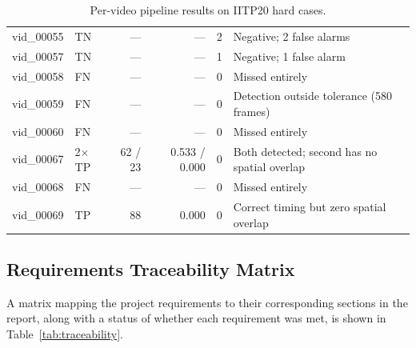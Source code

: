 \begin{table}[!htbp]
\begin{tabularx}{\textwidth}{l l r r c >{\raggedright\arraybackslash}X}
		\addlinespace
		vid\_00055     & TN               & ---                  & ---           & 2                  & Negative; 2 false alarms                             \\
		\addlinespace
		vid\_00057     & TN               & ---                  & ---           & 1                  & Negative; 1 false alarm                              \\
		\addlinespace
		vid\_00058     & FN               & ---                  & ---           & 0                  & Missed entirely                                      \\
		\addlinespace
		vid\_00059     & FN               & ---                  & ---           & 0                  & Detection outside tolerance (580 frames)             \\
		\addlinespace
		vid\_00060     & FN               & ---                  & ---           & 0                  & Missed entirely                                      \\
		\addlinespace
		vid\_00067     & 2$\times$TP      & 62 / 23              & 0.533 / 0.000 & 0                  & Both detected; second has no spatial overlap         \\
		\addlinespace
		vid\_00068     & FN               & ---                  & ---           & 0                  & Missed entirely                                      \\
		\addlinespace
		vid\_00069     & TP               & 88                   & 0.000         & 0                  & Correct timing but zero spatial overlap              \\
		\bottomrule
	\end{tabularx}
	\caption{Per-video pipeline results on IITP20 hard cases.}
	\label{tab:eval_iitp20_hard}
\end{table}

\subsection{Requirements Traceability Matrix}

A matrix mapping the project requirements to their corresponding sections in
the report, along with a status of whether each requirement was met, is shown
in Table~\ref{tab:traceability}.

